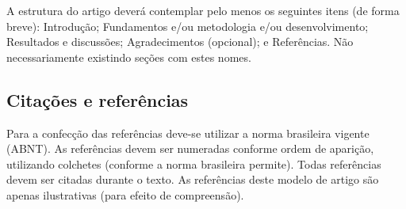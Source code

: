 
A estrutura do artigo deverá contemplar pelo menos os seguintes itens (de forma breve):
Introdução; Fundamentos e/ou metodologia e/ou desenvolvimento; Resultados e discussões; Agradecimentos (opcional); e Referências. Não necessariamente existindo seções com estes nomes. 
%
%


\subsection{Citações e referências}

Para a confecção das referências deve-se utilizar a norma brasileira vigente (ABNT). As referências devem ser numeradas conforme ordem de aparição, utilizando colchetes \cite{Mareze-2019} (conforme a norma brasileira permite). Todas referências devem ser citadas durante o texto. As referências \cite{Mareze-2017,Fonseca-2013,Brandao-2017,Oppenheim-2010,Muller-2001,Mareze-2019,Borges-2018,Ristow-2016} deste modelo de artigo são apenas ilustrativas (para efeito de compreensão).
%

